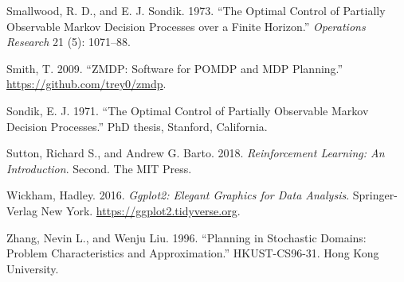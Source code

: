 \begin{CSLReferences}{1}{0}
\leavevmode{}%
Smallwood, R. D., and E. J. Sondik. 1973. {``The Optimal Control of Partially Observable {M}arkov Decision Processes over a Finite Horizon.''} \emph{Operations Research} 21 (5): 1071--88.

\leavevmode{}%
Smith, T. 2009. {``{ZMDP}: {S}oftware for {POMDP} and {MDP} Planning.''} \url{https://github.com/trey0/zmdp}.

\leavevmode{}%
Sondik, E. J. 1971. {``The Optimal Control of Partially Observable {M}arkov Decision Processes.''} PhD thesis, Stanford, California.

\leavevmode{}%
Sutton, Richard S., and Andrew G. Barto. 2018. \emph{Reinforcement Learning: {A}n Introduction}. Second. The MIT Press.

\leavevmode{}%
Wickham, Hadley. 2016. \emph{Ggplot2: Elegant Graphics for Data Analysis}. Springer-Verlag New York. \url{https://ggplot2.tidyverse.org}.

\leavevmode{}%
Zhang, Nevin L., and Wenju Liu. 1996. {``Planning in Stochastic Domains: {P}roblem Characteristics and Approximation.''} HKUST-CS96-31. Hong Kong University.

\end{CSLReferences}



\address{%
Michael Hahsler\\
Southern Methodist University\\%
Department of Computer Science\\ Dallas, TX, USA\\
%
\url{https://michael.hahsler.net}\\%
\textit{ORCiD: \href{https://orcid.org/0000-0003-2716-1405}{0000-0003-2716-1405}}\\%
\href{mailto:mhahsler@lyle.smu.edu}{\nolinkurl{mhahsler@lyle.smu.edu}}%
}

\address{%
Anthony R. Cassandra\\
POMDP, Inc\\%
Austin, TX, USA\\
%
\url{https://tonycassandra.com}\\%
%
\href{mailto:tony.cassandra@igmail.com}{\nolinkurl{tony.cassandra@igmail.com}}%
}
